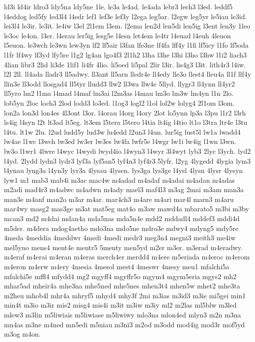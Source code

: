 {ld3i
ld4ir
ldro3
ldy5na
ldy5ne
1le.
le3a
le4ad.
le4ada
lebr3
lech3
l3ed.
leddf5
l4eddog
led5fy
led3l4
l4edr
lef1
lef3e
lef3y
l2ega
leg5ar.
l2egw
leg5yr
le5iau
le3id.
lei3l4
le3ir.
le3it.
le4iw
l3el
2l1em
l3em.
l2ema
len2d
len5di
len5ig
l3ent
len3y
1leo
le3oc
le4on.
l3er.
l4erau
ler5ig
lesg5e
l4esn
let4em
le4tr
l4euad
l4euh
4leuon
l5euon.
le3wch
le3wn
lew3yn
lf2
lf5air
l3fan
lfe3ne
lf4fa
lff4y
l1fi
lf5icy
l1fo
lf5oda
l1fr
lf4wy
lf3yd
lfy5re
l1g2
lg4an
lgo4f3
2l1h2
l3ha
l3he
l3hi
l3ho
l3hw
l1i2
liach3
4lian
libr3
2lid
li3de
1lif1
li4fr
4lio.
li5oed
li5pal
2lir
l3ir.
lis4g3
l3it.
lith4r3
l4iw.
l2l
2ll.
ll4ada
lladr3
ll5adwy.
ll3ant
ll5arn
lledr4e
ll4edy
lle3o
llest4
lleu4a
ll1f
llf4y
llin3e
ll3odd
llosgad4
ll5tyr
lludd3
llw2
ll3wa
llw4e
5llyd.
llygr3
ll4ynn
ll4yr2
ll5yro
lm2
l1ma
l4mad
l4maf
lm3ai
l2m3as
l4mau
lm3o
lm3w
lm4yn
l1n
2lo.
lob5yn
2loc
loch3
2lod
lodd3
lo3ed.
l1og3
logl2
l1ol
lol2w
lolyg4
2l1om
l3om.
lon2a
lon3d
lon4es
4l3ont
l3or.
l4orau
l4org
l4ory
2lot
lo5ynn
lp3a
l3pu
l1r2
l3rh
ls4ig
l4syn
l2t
lt3ad
lt5eg.
lt3em
l5tera
l5tero
l4tia
lt4ig
l4tio
lt1o
l3tra
ltr4e
l3tu
l4tu.
lt1w
2lu.
l2ud
ludd5y
lud3w
lu4edd
l2un3
l4un.
lur5ig
lust5l
lw1a
lwadd4
lw4ae
l1wc
l3wch
lw3ed
lw3er
lw3es
lw4fa
lwfr5e
l4wgr
lw1i
lw4ig
l1wn
l3wn.
lw3o
l1wr1
4lwre
l4wyc
l4wydi
lwyd4io
l4wyn3
l4wyr
3l4wyt
lyb3
2lyc
l3ych.
lyd2
l4yd.
2lydd
lydn3
lydr3
lyf3a
lyf5an5
lyf4n3
lyf4r3
5lyfr.
l2yg
4lygedd
4lygia
lym3
l4ynau
lyng3a
l4yn3y
lyr3a
4lysau
4lysen.
lys3ga
lys3ge
l4ysl
4lysn
4lysr
4lysyn
lyw1
m1
mab3
mab4i
m3ac
mac4w
m4adad
m4adaf
m4adai
m4adan
m4adas
m2adi
mad4r3
m4adwc
m4adwn
m4ady
mael3
maf4l3
m3ag
2mai
m3am
man3a
man3e
m4anf
man2o
m3ar
m4ar.
mar4ch3
m4are
m4ari
mar4l
marn3
m4aru
mar4wy
masg2
mas3ge
m3at
mat5eg
mat4o
m3aw
mawd4a
mbarato5
m3bi
m3by
mcan3
md2
m4dai
mdan4a
mda5nas
mda5n4e
mdd2
mddadl4
mddef3
mddi4d
m5der.
m4dera
mdog4aetho
mdo3na
mdo5ne
mdro3e
mdwy4
mdyng5
mdy5re
4meda
4meddia
4meddwr
4medi
4med^^ef
medr3
meg3n4
megni3
meith3
me4iw
mel5yno
mens4
ment4e
mentr5
5menty
men5yd
m2er
m3er.
m3erad
m4eradwy.
m4eraf
m4erai
m4eran
m4eras
merch4er
merdd4
m4ere
m5eriada
m4eroc
m4erom
m4eron
m4erw
m4ery
4mesia
4mesol
mest4
4meswr
4mesy
meu1
mfalchi5a
mfalchi5e
mffl4
mfydd4
mg2
mgyff4
mgyffr5o
mgym4
mgym5eria
mgys2
mh2
mhar5ad
mheir4a
mhe3na
mhe5ned
mhe5nes
mhen3t4
mhen5w
mhet2
mhe3ta
m2heu
mhob4l
mhr4a
mhryf5
mhyd4
mhy3f
2mi
m3ias
m3id3
m3ie
mi5gei
min1
min4t
m3io
m3ir
mis2
misg4
mis4i
m3it
m3iw
m3iy
ml2
m2las
ml5blw
m3led
mlew3
m3lin
m5liwiais
m5liwiase
m5liwiwy
mlo3na
mlon4ed
mlyn3
m2n
m3na
mn4as
m3ne
m4ned
mn5edi
m5niau
m3n^^ef3
m2od
m3odd
mod4ig
mod3r
mof5yd
m3og
m4on.
}
